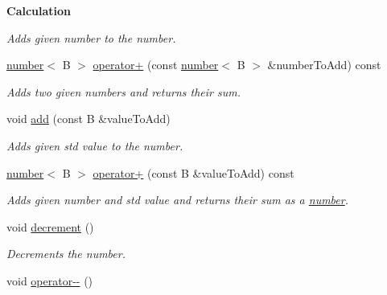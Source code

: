 \begin{Indent}{\bf Calculation}
\begin{DoxyCompactItemize}
\begin{DoxyCompactList}\small\item\em Adds given number to the number. \end{DoxyCompactList}\item 
\hypertarget{classcjr_1_1number_a3ead20a677d3bcd872895065fcfea6f7}{\hyperlink{classcjr_1_1number}{number}$<$ B $>$ \hyperlink{classcjr_1_1number_a3ead20a677d3bcd872895065fcfea6f7}{operator+} (const \hyperlink{classcjr_1_1number}{number}$<$ B $>$ \&number\-To\-Add) const }\label{classcjr_1_1number_a3ead20a677d3bcd872895065fcfea6f7}

\begin{DoxyCompactList}\small\item\em Adds two given numbers and returns their sum. \end{DoxyCompactList}\item 
\hypertarget{classcjr_1_1number_a4a3990a55896edfa85639c57d8c3c699}{void \hyperlink{classcjr_1_1number_a4a3990a55896edfa85639c57d8c3c699}{add} (const B \&value\-To\-Add)}\label{classcjr_1_1number_a4a3990a55896edfa85639c57d8c3c699}

\begin{DoxyCompactList}\small\item\em Adds given std value to the number. \end{DoxyCompactList}\item 
\hypertarget{classcjr_1_1number_af4753e77a4277f4290219e4e91763d8c}{\hyperlink{classcjr_1_1number}{number}$<$ B $>$ \hyperlink{classcjr_1_1number_af4753e77a4277f4290219e4e91763d8c}{operator+} (const B \&value\-To\-Add) const }\label{classcjr_1_1number_af4753e77a4277f4290219e4e91763d8c}

\begin{DoxyCompactList}\small\item\em Adds given number and std value and returns their sum as a \hyperlink{classcjr_1_1number}{number}. \end{DoxyCompactList}\item 
\hypertarget{classcjr_1_1number_a26eef97a8cbcf837b65e7dda206e623d}{void \hyperlink{classcjr_1_1number_a26eef97a8cbcf837b65e7dda206e623d}{decrement} ()}\label{classcjr_1_1number_a26eef97a8cbcf837b65e7dda206e623d}

\begin{DoxyCompactList}\small\item\em Decrements the number. \end{DoxyCompactList}\item 
\hypertarget{classcjr_1_1number_a2ffbd3e053d87dd7d53381df55111a79}{void \hyperlink{classcjr_1_1number_a2ffbd3e053d87dd7d53381df55111a79}{operator-\/-\/} ()}\label{classcjr_1_1number_a2ffbd3e053d87dd7d53381df55111a79}


\end{DoxyCompactItemize}
\end{Indent}
